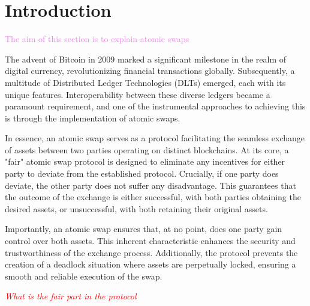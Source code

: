 \documentclass[manuscript,screen,review]{acmart}
\newcommand{\com}[1]{\textcolor{red}{\textit{#1}}}
\begin{document}
\section{Introduction}
\textcolor{violet}{The aim of this section is to explain atomic swaps}

The advent of Bitcoin in 2009 marked a significant milestone in the realm of digital currency, revolutionizing financial transactions globally. Subsequently, a multitude of Distributed Ledger Technologies (DLTs) emerged, each with its unique features. Interoperability between these diverse ledgers became a paramount requirement, and one of the instrumental approaches to achieving this is through the implementation of atomic swaps.

In essence, an atomic swap serves as a protocol facilitating the seamless exchange of assets between two parties operating on distinct blockchains. At its core, a "fair" atomic swap protocol is designed to eliminate any incentives for either party to deviate from the established protocol. Crucially, if one party does deviate, the other party does not suffer any disadvantage. This guarantees that the outcome of the exchange is either successful, with both parties obtaining the desired assets, or unsuccessful, with both retaining their original assets.

Importantly, an atomic swap ensures that, at no point, does one party gain control over both assets. This inherent characteristic enhances the security and trustworthiness of the exchange process. Additionally, the protocol prevents the creation of a deadlock situation where assets are perpetually locked, ensuring a smooth and reliable execution of the swap.



\com{What is the fair part in the protocol}
\end{document}
